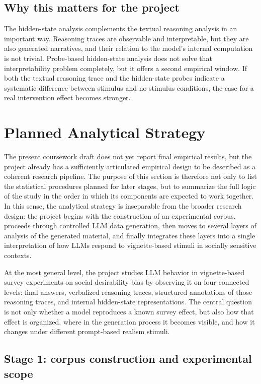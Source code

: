 \documentclass[14pt,a4paper]{extarticle}
\begin{document}
\subsection{Why this matters for the project}

The hidden-state analysis complements the textual reasoning analysis in an important way. Reasoning traces are observable and interpretable, but they are also generated narratives, and their relation to the model's internal computation is not trivial. Probe-based hidden-state analysis does not solve that interpretability problem completely, but it offers a second empirical window. If both the textual reasoning trace and the hidden-state probes indicate a systematic difference between stimulus and no-stimulus conditions, the case for a real intervention effect becomes stronger.

\section{Planned Analytical Strategy}

The present coursework draft does not yet report final empirical results, but the project already has a sufficiently articulated empirical design to be described as a coherent research pipeline. The purpose of this section is therefore not only to list the statistical procedures planned for later stages, but to summarize the full logic of the study in the order in which its components are expected to work together. In this sense, the analytical strategy is inseparable from the broader research design: the project begins with the construction of an experimental corpus, proceeds through controlled LLM data generation, then moves to several layers of analysis of the generated material, and finally integrates these layers into a single interpretation of how LLMs respond to vignette-based stimuli in socially sensitive contexts.

At the most general level, the project studies LLM behavior in vignette-based survey experiments on social desirability bias by observing it on four connected levels: final answers, verbalized reasoning traces, structured annotations of those reasoning traces, and internal hidden-state representations. The central question is not only whether a model reproduces a known survey effect, but also how that effect is organized, where in the generation process it becomes visible, and how it changes under different prompt-based realism stimuli.

\subsection{Stage 1: corpus construction and experimental scope}
\end{document}
